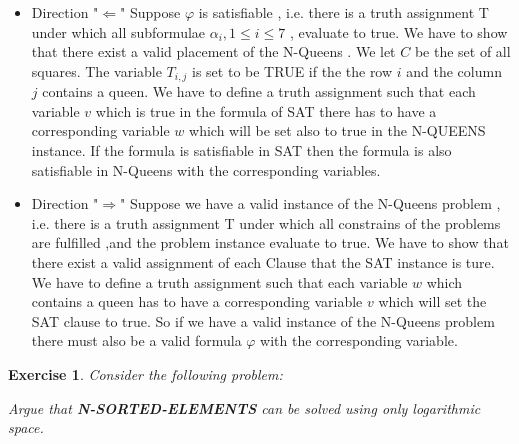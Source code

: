 \documentclass [11pt]{article}
\newtheorem{exercise}[theorem]{Exercise}
\renewcommand{\phi}{\varphi}
\begin{document}
 \begin{itemize}
\item Direction "$\Leftarrow$" 
Suppose $\phi$ is satisfiable , i.e. there is a truth assignment T under
which all subformulae  $ \alpha_i, 1 \leq i \leq 7$ , evaluate to true. We have to show
that there exist a valid placement of the N-Queens . We let $C$ be the set of all squares. The variable $T_{i,j}$ is set to be TRUE if  the the row $i$ and the column $j$ contains a queen. We have to define a truth assignment such that each variable $v$  which is true in the formula of SAT there has to have a corresponding variable $w$ which will be set also to true in the N-QUEENS instance. If the formula is satisfiable in SAT then the formula is also satisfiable in N-Queens with the corresponding variables.

\item Direction "$\Rightarrow$" 
Suppose we have a valid instance of the N-Queens problem , i.e. there is a truth assignment T under
which all constrains of the problems are fulfilled ,and the problem instance evaluate to true. We have to show
that there exist a valid assignment of each Clause that the SAT instance is ture. We have to define a truth assignment such that each variable $w$  which contains a queen has to have a corresponding variable $v$ which will set the SAT clause to true. So if we have a valid instance of the N-Queens problem there must also be a valid formula $\phi$ with the corresponding variable.

 \end{itemize}



 
 
 \begin{exercise}
  Consider the following problem:
  \begin{center}
  \end{center}

  \medskip Argue that \textbf{N-SORTED-ELEMENTS} can be solved using only logarithmic
  space.
\end{exercise}
\end{document}
